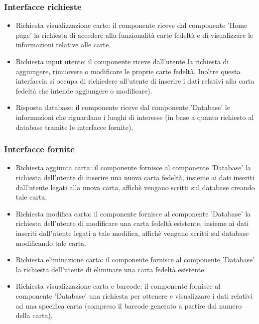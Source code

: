 \documentclass[a4paper,12pt]{article}
\begin{document}
\subsubsection*{Interfacce richieste}
\begin{itemize} \setlength\itemsep{0.01em}
\item {\sffamily Richiesta visualizzazione carte}: il componente riceve dal componente 'Home page'  la richiesta di accedere alla funzionalità carte fedeltà e di visualizzare le informazioni relative alle carte.
\item {\sffamily Richiesta input utente}: il componente riceve dall'utente la richiesta di aggiungere, rimuovere o modificare le proprie carte fedeltà. Inoltre questa interfaccia si occupa di richiedere all'utente di inserire i dati relativi alla carta fedeltà che intende aggiungere o modificare).
\item {\sffamily Risposta database}: il componente riceve dal componente 'Database' le informazioni che riguardano i luoghi di interesse (in base a quanto richiesto al database tramite le interfacce fornite).

\end{itemize}

\subsubsection*{Interfacce fornite}
\begin{itemize} \setlength\itemsep{0.01em}
\item {\sffamily Richiesta aggiunta carta}: il componente fornisce al componente 'Database' la richiesta dell'utente di inserire una nuova carta fedeltà, insieme ai dati inseriti dall'utente legati alla nuova carta, affichè vengano scritti sul database creando tale carta.
\item {\sffamily Richiesta modifica carta}: il componente fornisce al componente 'Database'  la richiesta dell'utente di modificare una carta fedeltà esistente, insieme ai dati inseriti dall'utente legati a tale modifica, affichè vengano scritti sul database modificando tale carta.
\item {\sffamily Richiesta eliminazione carta}: il componente fornisce al componente 'Database'  la richiesta dell'utente di eliminare una carta fedeltà esistente.
\item {\sffamily Richiesta visualizzazione carta e barcode}: il componente fornisce al componente 'Database' una richiesta per ottenere e visualizzare i dati relativi ad una specifica carta (compreso il barcode generato a partire dal numero della carta).
\end{itemize}
\end{document}
